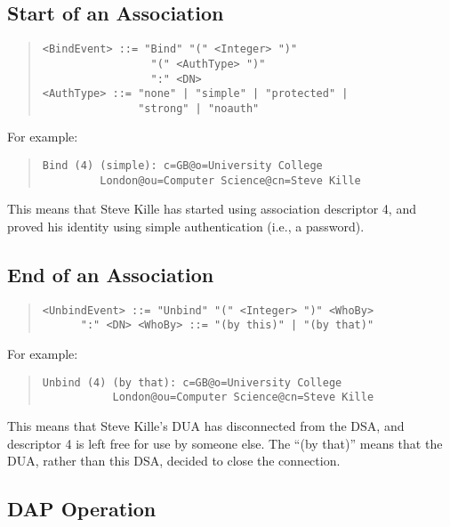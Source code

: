 \subsection{Start of an Association}

\begin{quote}\small\begin{verbatim}
<BindEvent> ::= "Bind" "(" <Integer> ")"
                 "(" <AuthType> ")" 
                 ":" <DN>
<AuthType> ::= "none" | "simple" | "protected" | 
               "strong" | "noauth"
\end{verbatim}\end{quote}

For example:

\begin{quote}\begin{verbatim}
Bind (4) (simple): c=GB@o=University College 
         London@ou=Computer Science@cn=Steve Kille
\end{verbatim}\end{quote}

This means that Steve Kille has started using association descriptor 4, and
proved his identity using simple authentication (i.e., a password).

\subsection{End of an Association}

\begin{quote}\begin{verbatim}
<UnbindEvent> ::= "Unbind" "(" <Integer> ")" <WhoBy> 
      ":" <DN> <WhoBy> ::= "(by this)" | "(by that)"
\end{verbatim}\end{quote}

For example:

\begin{quote}\begin{verbatim}
Unbind (4) (by that): c=GB@o=University College
           London@ou=Computer Science@cn=Steve Kille
\end{verbatim}\end{quote}

This means that Steve Kille's DUA has disconnected from the DSA, and descriptor
4 is left free for use by someone else. The ``(by that)'' means that the DUA,
rather than this DSA, decided to close the connection.

\subsection{DAP Operation}

